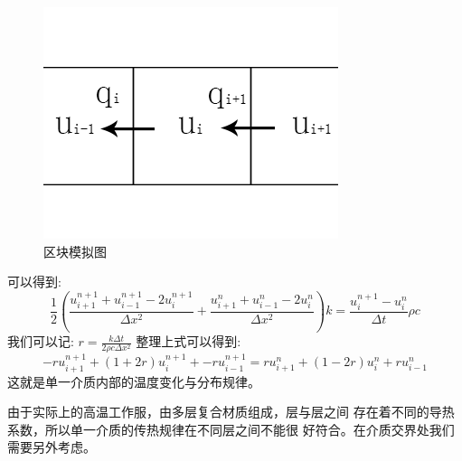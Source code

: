 \documentclass{cumcmthesis}
\begin{document}
            \begin{figure}[ht] 
                \centering 
                \includegraphics[scale=0.9]{../figure/diff.png} 
                \caption{区块模拟图}\label{diff}    
            \end{figure}
            可以得到:
            \[
                \frac{1}{2}
                \left(
                    \frac{u_{i+1}^{n+1} + u_{i-1}^{n+1} - 2u_{i}^{n+1} }{\Delta x^2}
                    +
                    \frac{u_{i+1}^{n} + u_{i-1}^{n} - 2u_{i}^{n} }{\Delta x^2}
                \right)
                k
                =
                \frac{ u_{i}^{n+1} - u_{i}^{n} }{\Delta t} \rho c
            \]
            我们可以记:
            \( r = \frac{k \Delta t}{ 2 \rho c \Delta x^2 } \)
            整理上式可以得到:
            \[
                -ru_{i+1}^{n+1} + (1+2r)u_{i}^{n+1} + -ru_{i-1}^{n+1}
                =
                ru_{i+1}^{n} + (1-2r)u_{i}^{n} + ru_{i-1}^{n}
            \]
            这就是单一介质内部的温度变化与分布规律。

            由于实际上的高温工作服，由多层复合材质组成，层与层之间
            存在着不同的导热系数，所以单一介质的传热规律在不同层之间不能很
            好符合。在介质交界处我们需要另外考虑。
\end{document}

